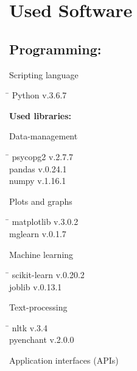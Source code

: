 \chapter*{Used Software}

\section*{Programming:}
\begin{large}Scripting language\end{large}
\begin{tabbing}
 \hspace*{5cm}  \= \kill
 Python \> v.3.6.7
\end{tabbing}
\textbf{Used libraries:}\\
\newline
\begin{large}Data-management\end{large}
\begin{tabbing}
 \hspace*{5cm}  \= \kill
 psycopg2 \> v.2.7.7 \\
 pandas \> v.0.24.1 \\
 numpy \> v.1.16.1
 \end{tabbing}
\begin{large}Plots and graphs\end{large}
\begin{tabbing}
  \hspace*{5cm}  \= \kill
  matplotlib \> v.3.0.2 \\
  mglearn \> v.0.1.7
 \end{tabbing}
\begin{large}Machine learning\end{large}
 \begin{tabbing}
  \hspace*{5cm}  \= \kill
  scikit-learn \> v.0.20.2 \\
  joblib \> v.0.13.1
 \end{tabbing}
\begin{large}Text-processing\end{large}
 \begin{tabbing}
  \hspace*{5cm}  \= \kill
   nltk \> v.3.4 \\
   pyenchant \> v.2.0.0
  \end{tabbing}
 \begin{large}Application interfaces (APIs)\end{large}
